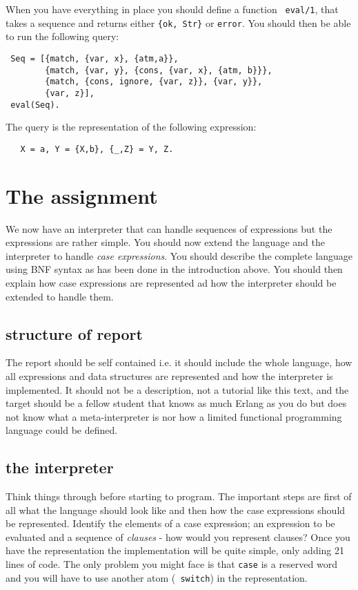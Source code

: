 \documentclass[a4paper,11pt]{article}
\begin{document}
When you have everything in place you should define a function {\tt
  eval/1}, that takes a sequence and returns either {\tt \{ok, Str\}}
or {\tt error}. You should then be able to run the following query:

\begin{verbatim}
 Seq = [{match, {var, x}, {atm,a}},
        {match, {var, y}, {cons, {var, x}, {atm, b}}},
        {match, {cons, ignore, {var, z}}, {var, y}},
        {var, z}],
 eval(Seq).
\end{verbatim}

The query is the representation of the following expression:

\begin{verbatim}
   X = a, Y = {X,b}, {_,Z} = Y, Z.
\end{verbatim}


\section{The assignment}

We now have an interpreter that can handle sequences of expressions
but the expressions are rather simple. You should now extend the
language and the interpreter to handle {\em case expressions}. You
should describe the complete language using BNF syntax as has been
done in the introduction above. You should then explain how case
expressions are represented ad how the interpreter should be extended to
handle them.

\subsection{structure of report}

The report should be self contained i.e. it should include the whole
language, how all expressions and data structures are represented and
how the interpreter is implemented. It should not be a description, not a tutorial like
this text, and the target should be a fellow student that knows as
much Erlang as you do but does not know what a meta-interpreter is
nor how a limited functional programming language could be defined.

\subsection{the interpreter}

Think things through before starting to program. The important steps
are first of all what the language should look like and then how the
case expressions should be represented. Identify the elements of a
case expression; an expression to be evaluated and a sequence of {\em
  clauses} - how would you represent clauses? Once you have the
representation the implementation will be quite simple, only adding
21 lines of code. The only problem you might face is that {\tt case}
is a reserved word and you will have to use another atom ({\tt
  switch}) in the representation.
\end{document}
